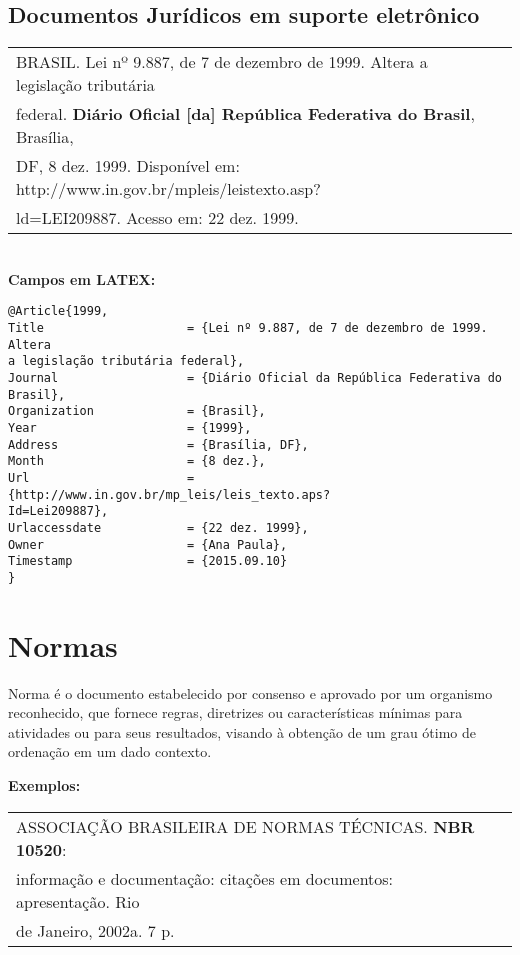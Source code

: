 \subsection{Documentos Jurídicos em suporte eletrônico}

\begin{tabular}{|l|c|} \hline
	BRASIL. Lei nº 9.887, de 7 de dezembro de 1999. Altera a legislação tributária\\
	federal. \textbf{Diário Oficial [da] República Federativa do Brasil}, Brasília,\\
	DF, 8 dez. 1999. Disponível em: http://www.in.gov.br/mpleis/leistexto.asp?\\
	ld=LEI209887. Acesso em: 22 dez. 1999. 
	\\\hline
\end{tabular} \\

\textbf{Campos em LATEX:} 

\begin{verbatim}
@Article{1999,
Title                    = {Lei nº 9.887, de 7 de dezembro de 1999. Altera 
a legislação tributária federal},
Journal                  = {Diário Oficial da República Federativa do 
Brasil},
Organization             = {Brasil},
Year                     = {1999},
Address                  = {Brasília, DF},
Month                    = {8 dez.},
Url                      = {http://www.in.gov.br/mp_leis/leis_texto.aps?
Id=Lei209887},
Urlaccessdate            = {22 dez. 1999},
Owner                    = {Ana Paula},
Timestamp                = {2015.09.10}
}
\end{verbatim}


\section{Normas}

Norma é o documento estabelecido por consenso e aprovado por um organismo reconhecido, que fornece regras, diretrizes ou características mínimas para atividades ou para seus resultados, visando à obtenção de um grau ótimo de ordenação em um dado contexto.

\textbf{Exemplos:} \\

\begin{tabular}{|l|c|} \hline
	ASSOCIAÇÃO BRASILEIRA DE NORMAS TÉCNICAS. \textbf{NBR 10520}: \\informação e documentação: citações em documentos: apresentação. Rio \\de Janeiro, 2002a. 7 p. 
	\\\hline
\end{tabular} \\

